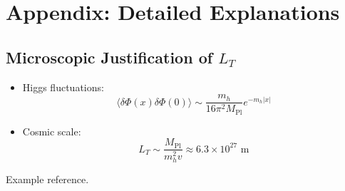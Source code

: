 \documentclass{article}
\newcommand{\Mpl}{M_{\text{Pl}}}
\begin{document}
	\section*{Appendix: Detailed Explanations}
	\subsection{Microscopic Justification of \(L_T\)}
	\begin{itemize}
		\item Higgs fluctuations:
		\begin{equation}
			\langle \delta\Phi(x) \delta\Phi(0) \rangle \sim \frac{m_h}{16\pi^2 \Mpl} e^{-m_h |x|}
		\end{equation}
		\item Cosmic scale:
		\begin{equation}
			L_T \sim \frac{\Mpl}{m_h^2 v} \approx 6.3 \times 10^{27} \text{ m}
		\end{equation}
	\end{itemize}
	
	\begin{thebibliography}{9}
		 Example reference.
	\end{thebibliography}
	
\end{document}
